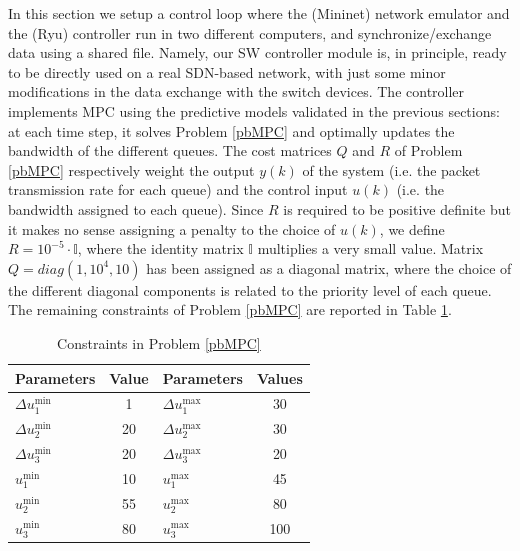 In this section we setup a control loop where the (Mininet) network emulator and the (Ryu) controller run in two different computers, and synchronize/exchange data using a shared file. Namely, our SW controller module is, in principle, ready to be directly used on a real SDN-based network, with just some minor modifications in the data exchange with the switch devices. The controller implements MPC using the predictive models validated in the previous sections: at each time step, it solves Problem \ref{pbMPC} and optimally updates the bandwidth of the different queues. The cost matrices $Q$ and $R$ of Problem \ref{pbMPC} respectively weight the output $y(k)$ of the system (i.e. the packet transmission rate for each queue) and the control input $u(k)$ (i.e. the bandwidth assigned to each queue). Since $R$ is required to be positive definite but it makes no sense assigning a penalty to the choice of $u(k)$, we define $R=10^{-5} \cdot \mathbb I$, where the identity matrix $\mathbb I$ multiplies a very small value. Matrix $Q = diag(1,10^4,10)$ has been assigned as a diagonal matrix, where the choice of the different diagonal components is related to the priority level of each queue. The remaining constraints of Problem \ref{pbMPC} are reported in Table \ref{tab:contPar}.
\begin{table}[h!]
	\caption{Constraints in Problem \ref{pbMPC}}
	\centering
	\begin{tabular}{l c l c}
		\hline\hline
		Parameters                                & Value               & Parameters                 & Values       \\ 
		\hline
		$\Delta u_1^\mathrm{min}$     & 1                   & $\Delta u_1^\mathrm{max}$  & 30           \\
		$\Delta u_2^\mathrm{min}$     & 20                  & $\Delta u_2^\mathrm{max}$  & 30           \\
		$\Delta u_3^\mathrm{min}$     & 20                  & $\Delta u_3^\mathrm{max}$  & 20           \\
		$u_1^\mathrm{min} $             & 10                  & $u_1^\mathrm{max} $        & 45           \\
		$u_2^\mathrm{min} $            & 55                  & $u_2^\mathrm{max} $        & 80           \\
		$u_3^\mathrm{min} $            & 80                  & $u_3^\mathrm{max} $        & 100          \\
		
		\hline
	\end{tabular}
	\label{tab:contPar}
\end{table}
